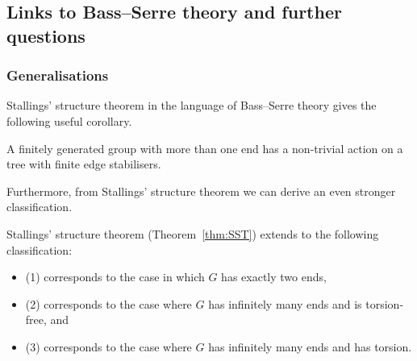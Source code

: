 \subsection{Links to Bass--Serre theory and further questions}
\subsubsection{Generalisations}
Stallings' structure theorem in the language of Bass--Serre theory gives the following useful corollary. 
\begin{corollary}
    A finitely generated group with more than one end has a non-trivial action on a tree with finite edge stabilisers.
\end{corollary}

Furthermore, from Stallings' structure theorem we can derive an even stronger classification.
\begin{theorem}
    Stallings' structure theorem (Theorem~\ref{thm:SST}) extends to the following classification: 
    \begin{itemize}
        \item (1) corresponds to the case in which \(G\) has exactly two ends,
        \item (2) corresponds to the case where \(G\) has infinitely many ends and is torsion-free, and
        \item (3) corresponds to the case where \(G\) has infinitely many ends and has torsion.
    \end{itemize}
\end{theorem}

